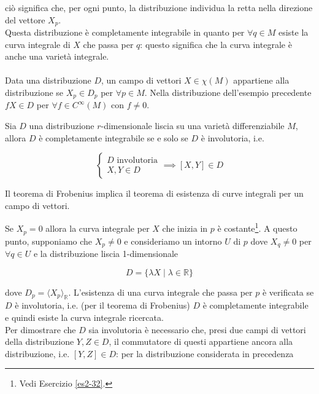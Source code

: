 ciò significa che, per ogni punto, la distribuzione individua la retta nella direzione del vettore $ X_{p} $.\\
Questa distribuzione è completamente integrabile in quanto per $ \forall q \in M $ esiste la curva integrale di $ X $ che passa per $ q $: questo significa che la curva integrale è anche una varietà integrale.\\\\
%
Data una distribuzione $ D $, un campo di vettori $ X \in \chi(M) $ appartiene alla distribuzione se $ X_{p} \in D_{p} $ per $ \forall p \in M $. Nella distribuzione dell'esempio precedente $ f X \in D $ per $ \forall f \in C^{\infty}(M) $ con $ f \neq 0 $.

\begin{theorem}[Frobenius]
	Sia $ D $ una distribuzione $ r $-dimensionale liscia su una varietà differenziabile $ M $, allora $ D $ è completamente integrabile se e solo se $ D $ è involutoria, i.e.
	
	\begin{equation}
		\begin{cases}
			D \text{ involutoria}\\
			X,Y \in D
		\end{cases}
		\implies%
		[X,Y] \in D
	\end{equation}
\end{theorem}

\begin{remark}
	Il teorema di Frobenius implica il teorema di esistenza di curve integrali per un campo di vettori.
\end{remark}

Se $ X_{p} = 0 $ allora la curva integrale per $ X $ che inizia in $ p $ è costante\footnote{%
	Vedi Esercizio \ref{es2-32}.%
}. A questo punto, supponiamo che $ X_{p} \neq 0 $ e consideriamo un intorno $ U $ di $ p $ dove $ X_{q} \neq 0 $ per $ \forall q \in U $ e la distribuzione liscia 1-dimensionale

\begin{equation}
	D = \{ \lambda X \mid \lambda \in \mathbb{R} \}
\end{equation}

dove $ D_{p} = \langle X_{p} \rangle_{\mathbb{R}} $. L'esistenza di una curva integrale che passa per $ p $ è verificata se $ D $ è involutoria, i.e. (per il teorema di Frobenius) $ D $ è completamente integrabile e quindi esiste la curva integrale ricercata.\\
Per dimostrare che $ D $ sia involutoria è necessario che, presi due campi di vettori della distribuzione $ Y,Z \in D $, il commutatore di questi appartiene ancora alla distribuzione, i.e. $ [Y,Z] \in D $: per la distribuzione considerata in precedenza

